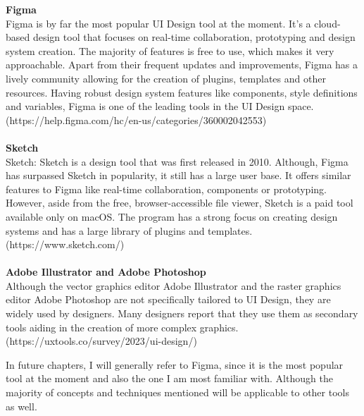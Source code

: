 \textbf{Figma}\\
Figma is by far the most popular UI Design tool at the moment. It's a cloud-based design tool
that focuses on real-time collaboration, prototyping and design system creation. The majority of
features is free to use, which makes it very approachable. Apart from their frequent updates and
improvements, Figma has a lively community allowing for the creation of plugins, templates and other
resources. Having robust design system features like components, style definitions and variables,
Figma is one of the leading tools in the UI Design space.
(https://help.figma.com/hc/en-us/categories/360002042553)\\\\
\textbf{Sketch}\\
Sketch: Sketch is a design tool that was first released in 2010. Although, Figma has surpassed
Sketch in popularity, it still has a large user base. It offers similar features to Figma like
real-time collaboration, components or prototyping. However, aside from the free, browser-accessible
file viewer, Sketch is a paid tool available only on macOS. The program has a strong focus on
creating design systems and has a large library of plugins and templates.
(https://www.sketch.com/)\\\\
\textbf{Adobe Illustrator and Adobe Photoshop}\\
Although the vector graphics editor Adobe Illustrator and the raster graphics editor Adobe Photoshop
are not specifically tailored to UI Design, they are widely used by designers. Many designers report
that they use them as secondary tools aiding in the creation of more complex graphics. (https://uxtools.co/survey/2023/ui-design/)

In future chapters, I will generally refer to Figma, since it is the most popular tool at the moment
and also the one I am most familiar with. Although the majority of concepts and techniques mentioned
will be applicable to other tools as well.
